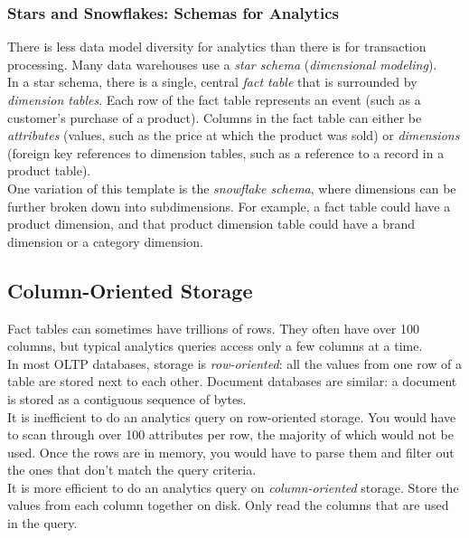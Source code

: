 \documentclass[12pt, titlepage]{article}
\begin{document}
\subsubsection{Stars and Snowflakes: Schemas for Analytics}

There is less data model diversity for analytics than there is for transaction processing. Many data warehouses use a \textit{star schema} (\textit{dimensional modeling}). \\

In a star schema, there is a single, central \textit{fact table} that is surrounded by \textit{dimension tables}. Each row of the fact table represents an event (such as a customer's purchase of a product). Columns in the fact table can either be \textit{attributes} (values, such as the price at which the product was sold) or \textit{dimensions} (foreign key references to dimension tables, such as a reference to a record in a product table). \\

One variation of this template is the \textit{snowflake schema}, where dimensions can be further broken down into subdimensions. For example, a fact table could have a product dimension, and that product dimension table could have a brand dimension or a category dimension.

\subsection{Column-Oriented Storage}

Fact tables can sometimes have trillions of rows. They often have over 100 columns, but typical analytics queries access only a few columns at a time. \\

In most OLTP databases, storage is \textit{row-oriented}: all the values from one row of a table are stored next to each other. Document databases are similar: a document is stored as a contiguous sequence of bytes. \\

It is inefficient to do an analytics query on row-oriented storage. You would have to scan through over 100 attributes per row, the majority of which would not be used. Once the rows are in memory, you would have to parse them and filter out the ones that don't match the query criteria. \\

It is more efficient to do an analytics query on \textit{column-oriented} storage. Store the values from each column together on disk. Only read the columns that are used in the query. \\
\end{document}
